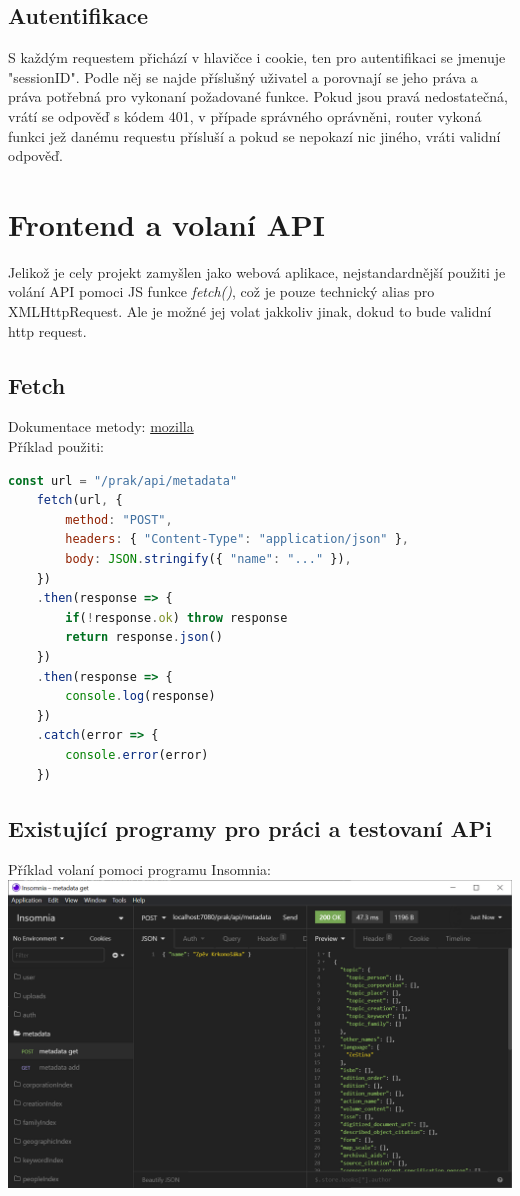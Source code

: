 \subsection{Autentifikace}
S každým requestem přichází v hlavičce i cookie, ten pro
autentifikaci se jmenuje "sessionID".
Podle něj se najde příslušný uživatel a porovnají se jeho práva a
práva potřebná pro vykonaní požadované funkce. Pokud jsou pravá nedostatečná, 
vrátí se odpověď s kódem 401, v případe správného oprávněni, router vykoná funkci
jež danému requestu přísluší a pokud se nepokazí nic jiného, vráti validní odpověď.

\section{Frontend a volaní API}
Jelikož je cely projekt zamyšlen jako webová aplikace, nejstandardnější použiti
je volání API pomoci JS funkce \textit{fetch()}, což je pouze technický alias pro XMLHttpRequest.
Ale je možné jej volat jakkoliv jinak, dokud to bude validní http request.

\subsection{Fetch}
Dokumentace metody: \href{https://developer.mozilla.org/en-US/docs/Web/API/Fetch_API}{mozilla}
\\
Příklad použiti:
\\
\begin{lstlisting}[language=JavaScript]
	const url = "/prak/api/metadata" 
	fetch(url, {
		method: "POST",
		headers: { "Content-Type": "application/json" },
		body: JSON.stringify({ "name": "..." }),
	})
	.then(response => {
		if(!response.ok) throw response
		return response.json()
	})
	.then(response => {
		console.log(response)
	})
	.catch(error => {
		console.error(error)
	})
\end{lstlisting}

\subsection{Existující programy pro práci a testovaní APi}
Příklad volaní pomoci programu Insomnia:
\\
\includegraphics[width=\textwidth]{img/InsomniaExample.PNG}

